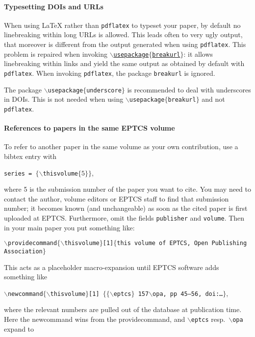 \documentclass[submission,copyright,creativecommons]{eptcs}
\begin{document}
\paragraph{Typesetting DOIs and URLs}

When using {\LaTeX} rather than {\tt pdflatex} to typeset your paper, by
default no linebreaking within long URLs is allowed. This leads often
to very ugly output, that moreover is different from the output
generated when using {\tt pdflatex}. This problem is repaired when
invoking \href{http://eptcs.web.cse.unsw.edu.au/breakurl.sty}
{\tt $\backslash$usepackage$\{$breakurl$\}$}: it allows linebreaking
within links and yield the same output as obtained by default with
{\tt pdflatex}.
When invoking {\tt pdflatex}, the package {\tt breakurl} is ignored.

The package {\tt $\backslash$usepackage$\{$underscore$\}$} is
recommended to deal with underscores in DOIs. This is not needed when
using {\tt $\backslash$usepackage$\{$breakurl$\}$} and not {\tt pdflatex}.

\paragraph{References to papers in the same EPTCS volume}

To refer to another paper in the same volume as your own contribution,
use a bibtex entry with
\begin{center}
  {\tt series    = $\{\backslash$thisvolume$\{5\}\}$},
\end{center}
where 5 is the submission number of the paper you want to cite.
You may need to contact the author, volume editors or EPTCS staff to
find that submission number; it becomes known (and unchangeable)
as soon as the cited paper is first uploaded at EPTCS\@.
Furthermore, omit the fields {\tt publisher} and {\tt volume}.
Then in your main paper you put something like:

\noindent
{\small \tt $\backslash$providecommand$\{\backslash$thisvolume$\}$[1]$\{$this
  volume of EPTCS, Open Publishing Association$\}$}

\noindent
This acts as a placeholder macro-expansion until EPTCS software adds
something like

\noindent
{\small \tt $\backslash$newcommand$\{\backslash$thisvolume$\}$[1]%
  $\{\{\backslash$eptcs$\}$ 157$\backslash$opa, pp 45--56, doi:\dots$\}$},

\noindent
where the relevant numbers are pulled out of the database at publication time.
Here the newcommand wins from the providecommand, and {\tt \small $\backslash$eptcs}
resp.\ {\tt \small $\backslash$opa} expand to
\end{document}
